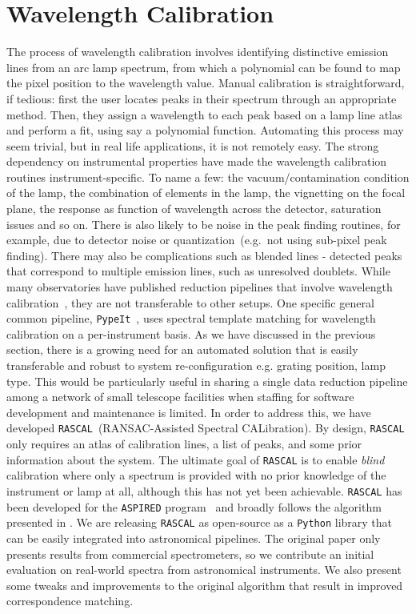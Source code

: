 \documentclass[fleqn,usenatbib]{rasti}
\begin{document}
\section{Wavelength Calibration}
The process of wavelength calibration involves identifying distinctive emission lines
from an arc lamp spectrum, from which a polynomial can be found to map the pixel
position to the wavelength value. Manual calibration is straightforward, if tedious: first the user locates peaks in their spectrum through an appropriate method. Then, they assign a wavelength to each peak based on a lamp line atlas and perform a fit, using say a polynomial function. Automating this process may seem trivial, but in real life applications, it is not remotely easy. The strong dependency on instrumental properties have made the wavelength calibration routines instrument-specific. To name a few: the vacuum/contamination condition of the lamp, the 
combination of elements in the lamp, the vignetting on the focal plane, the response
as function of wavelength across the detector, saturation issues and so on. There is also likely
to be noise in the peak finding routines, for example, due to detector noise or
quantization~(e.g.\ not using sub-pixel peak finding). There may also be complications
such as blended lines - detected peaks that correspond to multiple emission lines,
such as unresolved doublets. While many observatories have published reduction
pipelines that involve wavelength calibration~\citep{2002AJ....123..485S,
2012ascl.soft03003C, 2013ApJS..208....5N}, they are not transferable to other setups.
One specific general common pipeline, \texttt{PypeIt}~\citep{2020JOSS....5.2308P}, uses spectral template matching for wavelength calibration on a  
per-instrument basis. As we have discussed in the previous section, there is a growing need
for an automated solution that is easily transferable and robust to system 
re-configuration e.g. grating position, lamp type. This would be particularly
useful in sharing a single data reduction pipeline among a network of small telescope
facilities when staffing for software development and maintenance is limited.
In order to address this, we have developed \texttt{RASCAL}~(RANSAC-Assisted Spectral CALibration).
By design, \texttt{RASCAL} only requires an atlas of calibration lines, a list of peaks, and some prior information
about the system. The ultimate goal of \texttt{RASCAL} is to enable \textit{blind} calibration where only a spectrum is provided with no prior knowledge of the instrument or lamp at all, although this has not yet been achievable. \texttt{RASCAL} has been developed for the \texttt{ASPIRED}
program~\citep{2019arXiv191205885L, 2020arXiv201203505L, 2020zndo...4306065L}
and broadly follows the algorithm presented in \citet{2018ApOpt..57.6876S}. We are
releasing \texttt{RASCAL} as open-source as a \texttt{Python} library that can be easily integrated into
astronomical pipelines. The original paper only presents results from commercial
spectrometers, so we contribute an initial evaluation on real-world spectra
from astronomical instruments. We also present some tweaks and improvements to the
original algorithm that result in improved correspondence matching.
\end{document}

